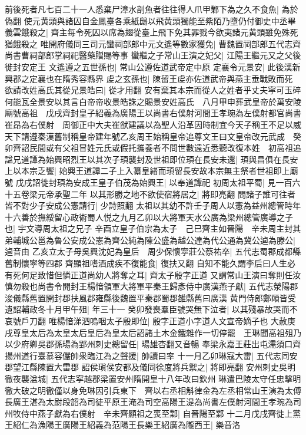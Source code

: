 前後死者凡七百二十一人悉棄尸漳水剖魚者往往得人爪甲鄴下為之久不食魚|{
	為於偽翻}
使元黄頭與諸囚自金鳳臺各乘紙鴟以飛黄頭獨能至紫陌乃墮仍付御史中丞畢義雲餓殺之|{
	齊主每令死囚以席為翅從臺上飛下免其罪戮今欲夷諸元黄頭雖免殊死猶餓殺之}
唯開府儀同三司元蠻祠部郎中元文遙等數家獲免|{
	曹魏置祠部郎五代志齊尚書曹祠部郎掌祠祀醫藥贈賜等事}
蠻繼之子常山王演之妃父|{
	江陽王繼元又之父後徙封安定王}
文遙遵之五世孫也|{
	常山公遵佐道武帝定中原}
定襄令元景安|{
	此後漢新興郡之定襄也在隋秀容縣界}
䖍之玄孫也|{
	陳留王䖍亦佐道武帝與燕主垂戰敗而死}
欲請改姓高氏其從兄景皓曰|{
	從才用翻}
安有棄其本宗而從人之姓者乎丈夫寜可玉碎何能瓦全景安以其言白帝帝收景皓誅之賜景安姓高氏　八月甲申葬武皇帝於萬安陵廟號高祖　戊戌齊封皇子紹義為廣陽王以尚書右僕射河間王孝琬為左僕射都官尚書崔昂為右僕射　周御正中大夫崔猷建議以為聖人沿革因時制宜今天子稱王不足以威天下請遵秦漢舊制稱皇帝建年號乙亥周王始稱皇帝追尊文王曰文皇帝改元武成　癸卯齊詔民間或有父祖冒姓元氏或假托攜養者不問世數遠近悉聽改復本姓　初高祖追諡兄道譚為始興昭烈王以其次子頊襲封及世祖即位頊在長安未還|{
	頊與昌俱在長安}
上以本宗乏饗|{
	始興王道譚二子上入纂皇緒而頊留長安故本宗無主祭者世祖即上廟號}
戊戌詔徙封頊為安成王皇子伯茂為始興王|{
	以奉道譚祀}
初周太祖平蜀|{
	見一百六十五卷梁元帝承聖二年}
以其形勝之地不欲使宿將居之|{
	將即亮翻}
問諸子誰可往者皆不對少子安成公憲請行|{
	少詩照翻}
太祖以其幼不許壬子周人以憲為益州總管時年十六善於撫綏留心政術蜀人悦之九月乙卯以大將軍天水公廣為梁州總管廣導之子也|{
	宇文導周太祖之兄子}
辛酉立皇子伯宗為太子　己巳齊主如晉陽　辛未周主封其弟輔城公邕為魯公安成公憲為齊公純為陳公盛為越公達為代公通為冀公逌為滕公|{
	逌音由}
乙亥立太子母吳興沈妃為皇后　周少保懷寜莊公蔡祐卒|{
	五代志蜀郡成都縣舊制懷寜等四郡}
齊顯祖嗜酒成疾不復能食|{
	復扶又翻}
自知不能久謂李后曰人生必有死何足致惜但憐正道尚幼人將奪之耳|{
	齊太子殷字正道}
又謂常山王演曰奪則任汝慎勿殺也尚書令開封王楊愔領軍大將軍平秦王歸彥侍中廣漢燕子獻|{
	五代志滎陽郡浚儀縣舊置開封郡扶風郡雍縣後魏置平秦郡蜀郡雒縣舊曰廣漢}
黄門侍郎鄭頤皆受遺詔輔政冬十月甲午殂|{
	年三十一}
癸卯發喪羣臣號哭無下泣者|{
	以其殘暴故哭而不哀號戶刀翻}
唯楊愔涕泗嗚咽太子殷即位|{
	殷字正道小字道人文宣帝嫡子也}
大赦庚戌尊皇太后為太皇太后皇后為皇太后詔諸土木金鐵雜作一切停罷　王琳聞高祖殂乃以少府卿吳郡孫瑒為郢州刺史總留任|{
	瑒雄杏翻又音暢}
奉梁永嘉王莊出屯濡須口齊揚州道行臺慕容儼帥衆臨江為之聲援|{
	帥讀曰率}
十一月乙卯琳寇大雷|{
	五代志同安郡望江縣陳置大雷郡}
詔侯瑱侯安都及儀同徐度將兵禦之|{
	將即亮翻}
安州刺史吳明徹夜襲湓城|{
	五代志寜越郡梁置安州隋開皇十八年改曰欽州}
琳遣巴陵太守任忠擊明徹大破之明徹僅以身免琳因引兵東下　齊以右丞相斛律金為左丞相常山王演為太傅長廣王湛為太尉段韶為司徒平原王淹為司空高陽王湜為尚書左僕射河間王孝琬為司州牧侍中燕子獻為右僕射　辛未齊顯祖之喪至鄴|{
	自晉陽至鄴}
十二月戊戌齊徙上黨王紹仁為漁陽王廣陽王紹義為范陽王長樂王紹廣為隴西王|{
	樂音洛}


